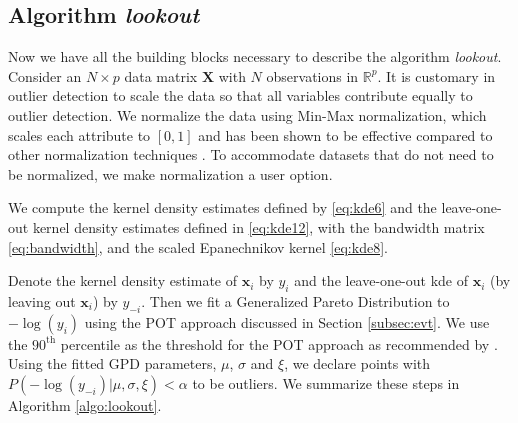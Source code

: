 \documentclass[11pt,a4paper,]{article}
\theoremstyle{definition}
\theoremstyle{definition}
\theoremstyle{definition}
\theoremstyle{remark}
\begin{document}
\hypertarget{algorithm-lookout}{%
\subsection{\texorpdfstring{Algorithm \emph{lookout}}{Algorithm lookout}}\label{algorithm-lookout}}

Now we have all the building blocks necessary to describe the algorithm \emph{lookout}. Consider an \(N \times p\) data matrix \(\bm{X}\) with \(N\) observations in \(\mathbb{R}^p\). It is customary in outlier detection to scale the data so that all variables contribute equally to outlier detection. We normalize the data using Min-Max normalization, which scales each attribute to \([0, 1]\) and has been shown to be effective compared to other normalization techniques \autocite{kandanaarachchi2018normalization}. To accommodate datasets that do not need to be normalized, we make normalization a user option.

We compute the kernel density estimates defined by \eqref{eq:kde6} and the leave-one-out kernel density estimates defined in \eqref{eq:kde12}, with the bandwidth matrix \eqref{eq:bandwidth}, and the scaled Epanechnikov kernel \eqref{eq:kde8}.

Denote the kernel density estimate of \(\bm{x}_i\) by \(y_i\) and the leave-one-out kde of \(\bm{x}_i\) (by leaving out \(\bm{x}_i\)) by \(y_{-i}\). Then we fit a Generalized Pareto Distribution to \(-\log(y_i)\) using the POT approach discussed in Section \ref{subsec:evt}. We use the \(90^{\text{th}}\) percentile as the threshold for the POT approach as recommended by \textcite{bommier2014peaks}. Using the fitted GPD parameters, \(\mu\), \(\sigma\) and \(\xi\), we declare points with \(P\left(-\log(y_{-i})|\mu, \sigma,\xi \right) < \alpha\) to be outliers. We summarize these steps in Algorithm \ref{algo:lookout}.
\end{document}
